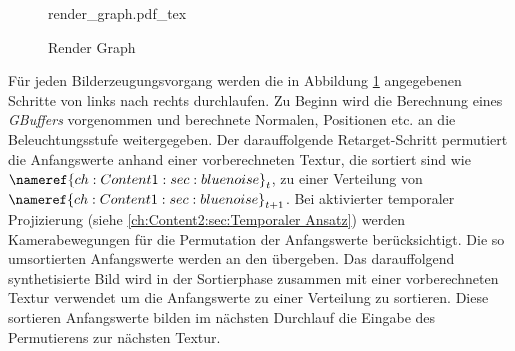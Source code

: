 \begin{figure}[H]
    \begin{tcolorbox}
    \centering
    \def\svgwidth{\columnwidth}
    {render_graph.pdf_tex}
    \end{tcolorbox}
    \caption{Render Graph}
    \label{pic:Render Graph}
\end{figure}

Für jeden Bilderzeugungsvorgang werden die in Abbildung \ref{pic:Render Graph} angegebenen Schritte von links nach rechts 
durchlaufen. Zu Beginn wird die Berechnung eines \textit{GBuffers} vorgenommen und berechnete Normalen, Positionen etc. 
an die Beleuchtungsstufe weitergegeben. Der darauffolgende Retarget-Schritt permutiert die Anfangswerte anhand einer 
vorberechneten Textur, die sortiert sind wie $\nameref{ch:Content1:sec:blue noise}_{t}$, zu einer Verteilung von 
$\nameref{ch:Content1:sec:blue noise}_{t+1}$. Bei aktivierter temporaler Projizierung (siehe \ref{ch:Content2:sec:Temporaler Ansatz})
werden Kamerabewegungen für die Permutation der Anfangswerte berücksichtigt. Die so umsortierten Anfangswerte werden an den 
 übergeben. Das darauffolgend synthetisierte Bild wird in der Sortierphase zusammen mit einer
vorberechneten  Textur verwendet um die Anfangswerte zu einer 
Verteilung zu sortieren. Diese sortieren Anfangswerte bilden im nächsten Durchlauf die Eingabe des Permutierens zur nächsten 
 Textur.